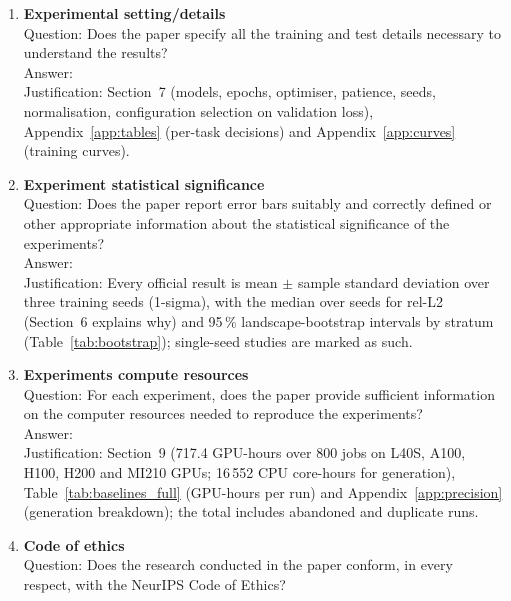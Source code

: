 \documentclass{article}
\newcommand{\relltwo}{rel-L2}
\newcommand{\code}[1]{\texttt{#1}}
\begin{document}
\begin{enumerate}
    Answer: \answerYes{}\\
    Justification: Data on the Hugging Face Hub (CC BY 4.0) with Croissant metadata and a \code{mini} sample; code (MIT) with a README quickstart, the exact evaluation command (Appendix~\ref{app:format}) and the leaderboard tooling; anonymised at submission.
\item {\bf Experimental setting/details}\\
    Question: Does the paper specify all the training and test details necessary to understand the results?\\
    Answer: \answerYes{}\\
    Justification: Section~7 (models, epochs, optimiser, patience, seeds, normalisation, configuration selection on validation loss), Appendix~\ref{app:tables} (per-task decisions) and Appendix~\ref{app:curves} (training curves).
\item {\bf Experiment statistical significance}\\
    Question: Does the paper report error bars suitably and correctly defined or other appropriate information about the statistical significance of the experiments?\\
    Answer: \answerYes{}\\
    Justification: Every official result is mean $\pm$ sample standard deviation over three training seeds (1-sigma), with the median over seeds for \relltwo{} (Section~6 explains why) and 95\,\% landscape-bootstrap intervals by stratum (Table~\ref{tab:bootstrap}); single-seed studies are marked as such.
\item {\bf Experiments compute resources}\\
    Question: For each experiment, does the paper provide sufficient information on the computer resources needed to reproduce the experiments?\\
    Answer: \answerYes{}\\
    Justification: Section~9 (717.4 GPU-hours over 800 jobs on L40S, A100, H100, H200 and MI210 GPUs; 16\,552 CPU core-hours for generation), Table~\ref{tab:baselines_full} (GPU-hours per run) and Appendix~\ref{app:precision} (generation breakdown); the total includes abandoned and duplicate runs.
\item {\bf Code of ethics}\\
    Question: Does the research conducted in the paper conform, in every respect, with the NeurIPS Code of Ethics?\\

\end{enumerate}
\end{document}
